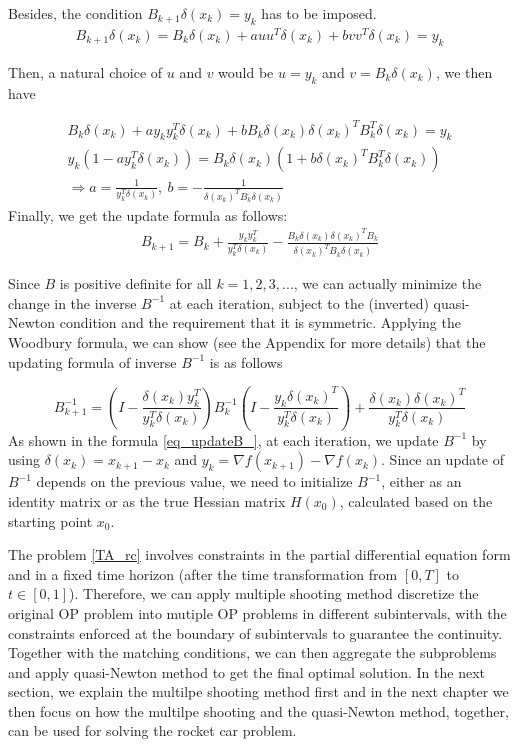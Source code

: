 	Besides, the condition $B_{k+1}\delta(x_k) = y_k$ has to be imposed.
	\begin{align*}
		B_{k+1}\delta(x_k) = B_k\delta(x_k)  + a u u^T\delta(x_k) + b v v^T\delta(x_k) = y_k
	\end{align*}
	
	Then, a natural choice of $u$ and $v$ would be $u=y_k$ and $v=B_k\delta(x_k)$, we then have
	
	\begin{align*}
		B_k\delta(x_k) + a y_ky^T_k\delta(x_k) + bB_k\delta(x_k) \delta(x_k)^TB_k^T\delta(x_k) = y_k  \\
		y_k(1-ay_k^T\delta(x_k) ) = B_k\delta(x_k)(1+ b \delta(x_k)^TB_k^T\delta(x_k)) \\
		\Rightarrow a = \frac{1}{y_k^T\delta(x_k)}, \  b= - \frac{1}{\delta(x_k)^TB_k\delta(x_k)}
	\end{align*}
	Finally, we get the update formula as follows: 
	\begin{align*}
		B_{k+1} = B_k +  \frac{y_ky_k^T}{y_k^T\delta(x_k)}  - \frac{B_k\delta(x_k)\delta(x_k)^TB_k}{\delta(x_k)^TB_k\delta(x_k)}
	\end{align*}
	
	Since $B$ is positive definite for all $k = 1,2, 3, ...$, we can actually minimize the change in the inverse $B^{-1}$ at each iteration, subject to the (inverted) quasi-Newton condition and the requirement that it is symmetric. Applying the Woodbury formula, we can show (see the Appendix for more details) that the updating formula of inverse $B^{-1}$ is as follows
	
	\begin{equation}
		B_{k+1}^{-1} = (I - \frac{\delta(x_k)y_k^T}{y_k^T\delta(x_k)})B_k^{-1}(I - \frac{y_k\delta(x_k)^T}{y_k^T\delta(x_k)}) +  \frac{\delta(x_k)\delta(x_k)^T}{y_k^T\delta(x_k)} 
		\label{eq_updateB_}
	\end{equation}
	As shown in the formula \ref{eq_updateB_}, at each iteration, we update $B^{-1}$ by using  $\delta(x_k) = x_{k+1} -x_k$ and $y_k = \nabla f(x_{k+1}) - \nabla f(x_k)$. Since an update of $B^{-1}$ depends on the previous value, we need to initialize $B^{-1}$, either as an identity matrix or as the true Hessian matrix $H(x_0)$, calculated based on the starting point $x_0$.
	
	The problem \ref{TA_rc} involves constraints in the partial differential equation form and in a fixed time horizon (after the time transformation from $[0, T]$ to $t \in [0, 1]$). Therefore, we can apply multiple shooting method discretize the original OP problem into mutiple OP problems in different subintervals, with the constraints enforced at the boundary of subintervals to guarantee the continuity. Together with the matching conditions, we can then aggregate the subproblems and apply quasi-Newton method to get the final optimal solution. In the next section, we explain the multilpe shooting method first and in the next chapter we then focus on how the multilpe shooting and the quasi-Newton method, together, can be used for solving the rocket car problem.  
	

